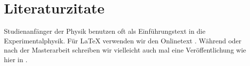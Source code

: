 \documentclass[12pt,a4paper,bibtotoc]{scrartcl}
\begin{document}
%
\tableofcontents
\section{Literaturzitate}
Studienanfänger der Physik benutzen oft \cite{gerthsen2013physik} als
Einführungstext in die Experimentalphysik. Für \LaTeX{} verwenden wir
den Onlinetext \cite{daniel2015l2lurz}. Während oder nach der
Masterarbeit schreiben wir vielleicht auch mal eine Veröffentlichung
wie hier in \cite{heymans2006shear}.
%
\printbibliography
\end{document}
